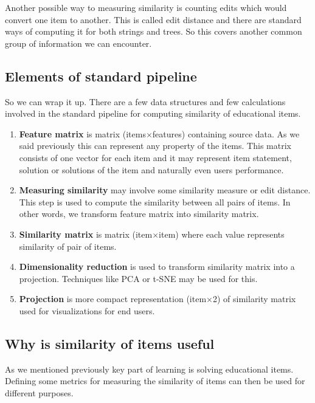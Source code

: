 \documentclass[
  digital, %
  table,   %
  nolof,     %
  nolot,     %
  nocover
]{fithesis3}
\begin{document}
Another possible way to measuring similarity is counting edits which would convert one item to another. This is called edit distance and there are standard ways of computing it for both strings and trees. So this covers another common group of information we can encounter.

\subsection{Elements of standard pipeline}\label{elements-of-standard-pipeline}

So we can wrap it up. There are a few data structures and few calculations involved in the standard pipeline for computing similarity of educational items.

\begin{enumerate}
  \item
    \textbf{Feature matrix} is matrix (items$\times$features) containing source data. As we said previously this can represent any property of the items. This matrix consists of one vector for each item and it may represent item statement, solution or solutions of the item and naturally even users performance.
  \item
    \textbf{Measuring similarity} may involve some similarity measure or edit distance. This step is used to compute the similarity between all pairs of items. In other words, we transform feature matrix into similarity matrix.
  \item
    \textbf{Similarity matrix} is matrix (item$\times$item) where each value represents similarity of pair of items.
  \item
    \textbf{Dimensionality reduction} is used to transform similarity matrix into a projection. Techniques like PCA or t-SNE may be used for this.
  \item
    \textbf{Projection} is more compact representation (item$\times$2) of similarity matrix used for visualizations for end users.
\end{enumerate}

\subsection{Why is similarity of items useful}\label{why-is-similarity-of-items-useful}


As we mentioned previously key part of learning is solving educational items. Defining some metrics for measuring the similarity of items can then be used for different purposes.
\end{document}
